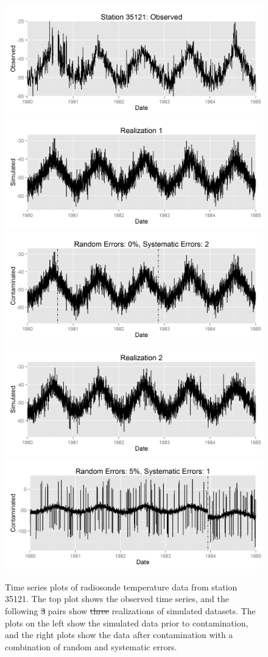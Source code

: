 \documentclass[12pt]{article}
\providecommand{\DIFaddtex}[1]{{\protect\color{blue}\uwave{#1}}} %
\providecommand{\DIFdeltex}[1]{{\protect\color{red}\sout{#1}}}                      %
\providecommand{\DIFaddFL}[1]{\DIFadd{#1}} %
\providecommand{\DIFdelFL}[1]{\DIFdel{#1}} %
\providecommand{\DIFaddbeginFL}{} %
\providecommand{\DIFaddendFL}{} %
\providecommand{\DIFdelbeginFL}{} %
\providecommand{\DIFdelendFL}{} %
\providecommand{\DIFadd}[1]{\texorpdfstring{\DIFaddtex{#1}}{#1}} %
\providecommand{\DIFdel}[1]{\texorpdfstring{\DIFdeltex{#1}}{}} %
\begin{document}
\begin{figure}
	\centering
	\includegraphics[width=.9\textwidth]{35121_time_series.png}\\
	\includegraphics[width=.45\textwidth]{35121_simulated_1.png}
	\includegraphics[width=.45\textwidth]{35121_contaminated_1.png}\\
	\includegraphics[width=.45\textwidth]{35121_simulated_2.png}
	\includegraphics[width=.45\textwidth]{35121_contaminated_2.png}\\
	\DIFdelbeginFL %
\DIFdelendFL %
	\caption{Time series plots of radiosonde temperature data from station 35121.  The top plot shows the observed time series, and the following \DIFdelbeginFL \DIFdelFL{3 }\DIFdelendFL \DIFaddbeginFL \DIFaddFL{two }\DIFaddendFL pairs show \DIFdelbeginFL \DIFdelFL{three }\DIFdelendFL realizations of simulated datasets.  The plots on the left show the simulated data prior to contamination, and the right plots show the data after contamination with a combination of random and systematic errors.}
	\label{fig:simExample}
\end{figure}
\end{document}
